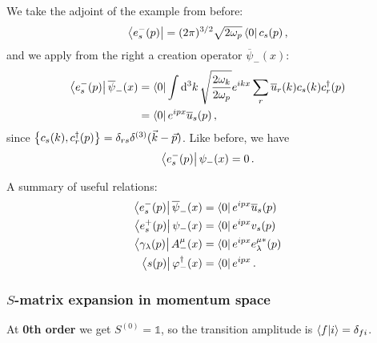 \documentclass[main.tex]{subfiles}
\begin{document}
We take the adjoint of the example from before: 
%
\begin{align}
\bra{e^{-}_{s} (p)} = (2 \pi)^{3/2} \sqrt{2 \omega_{p}}
\bra{0} c_s (p)
\,,
\end{align}
%
and we apply from the right a creation operator \(\overline{\psi}_{-}(x)\): 
%
\begin{align}
\bra{e^{-}_{s}(p)}
\overline{\psi}_{-}(x)
&= \bra{0} \int \dd[3]{k}
\sqrt{ \frac{2 \omega_{k}}{2 \omega_{p}}}
e^{ikx} \sum _{r} \overline{u}_{r} (k) c_s (k) c_r ^\dag (p)  \\
&= \bra{0} e^{ipx} \overline{u}_{s} (p)
\,,
\end{align}
%
since \(\qty{c_s (k), c_r ^\dag (p)} = \delta_{rs} \delta^{(3)}(\vec{k} - \vec{p})\). Like before, we have 
%
\begin{align}
\bra{e^{-}_{s}(p)} \psi_{-} (x) = 0
\,.
\end{align}

A summary of useful relations: 
%
\begin{align}
\bra{e^{-}_{s} (p)} \overline{\psi}_{-} (x) &= \bra{0} e^{ipx} \overline{u}_{s} (p) \\
\bra{e^{+}_{s} (p)} \psi_{-} (x) &= \bra{0} e^{ipx} v_{s} (p) \\
\bra{\gamma_{\lambda } (p)} A^{\mu }_{-} (x) &= \bra{0} e^{ipx} e^{\mu *}_{\lambda }(p) \\
\bra{s(p)} \varphi ^\dag_{-} (x) &= \bra{0} e^{ipx} 
\,.
\end{align}

\subsubsection{\(S\)-matrix expansion in momentum space}

At \textbf{0th order} we get \(S^{(0)} = \mathbb{1}\), so the transition amplitude is \(\braket{f}{i}= \delta_{fi} \). 
\end{document}
